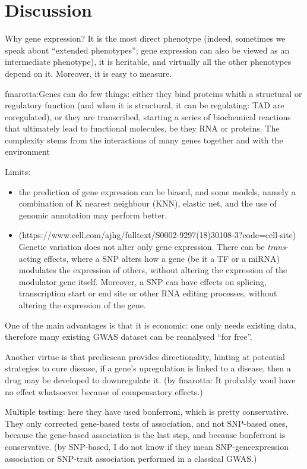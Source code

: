 \documentclass[../main.tex]{subfiles}
\begin{document}
\section{Discussion}

Why gene expression? It is the most direct phenotype (indeed, sometimes 
we speak about \enquote{extended phenotypes}; gene expression can also 
be viewed as an intermediate phenotype), it is heritable, and virtually 
all the other phenotypes depend on it. Moreover, it is easy to measure.

fmarotta:Genes can do few things: either they bind proteins whith a 
structural or regulatory function (and when it is structural, it can be 
regulating: TAD are coregulated), or they are transcribed, starting a 
series of biochemical reactions that ultimately lead to functional 
molecules, be they RNA or proteins. The complexity stems from the 
interactions of many genes together and with the environment

Limits:
\begin{itemize}
	\item
the prediction of gene expression can be biased, and some models, namely 
a combination of K nearest neighbour (KNN), elastic net, and the use of 
genomic annotation may perform better.
	\item 
(https://www.cell.com/ajhg/fulltext/S0002-9297(18)30108-3?code=cell-site) 
Genetic variation does not alter only gene expression. There can be 
\textit{trans}-acting effects, where a SNP alters how a gene (be it a TF 
or a miRNA) modulates the expression of others, without altering the 
expression of the modulator gene itself. Moreover, a SNP can have 
effects on splicing, transcription start or end site or other RNA 
editing processes, without altering the expression of the gene.
\end{itemize}

One of the main advantages is that it is economic: one only needs 
existing data, therefore many existing GWAS dataset can be reanalysed 
\enquote{for free}.

Another virtue is that predicscan provides directionality, hinting at 
potential strategies to cure disease, \eg if a gene's upregulation is 
linked to a disease, then a drug may be developed to downregulate it. 
(by fmarotta: It probably woul have no effect whatsoever because of 
compensatory effects.)

Multiple testing: here they have used bonferroni, which is pretty 
conservative. They only corrected gene-based tests of association, and 
not SNP-based ones, because the gene-based association is the last step, 
and because bonferroni is conservative. (by SNP-based, I do not know if 
they mean SNP-geneexpression association or SNP-trait association 
performed in a classical GWAS.)
\end{document}
